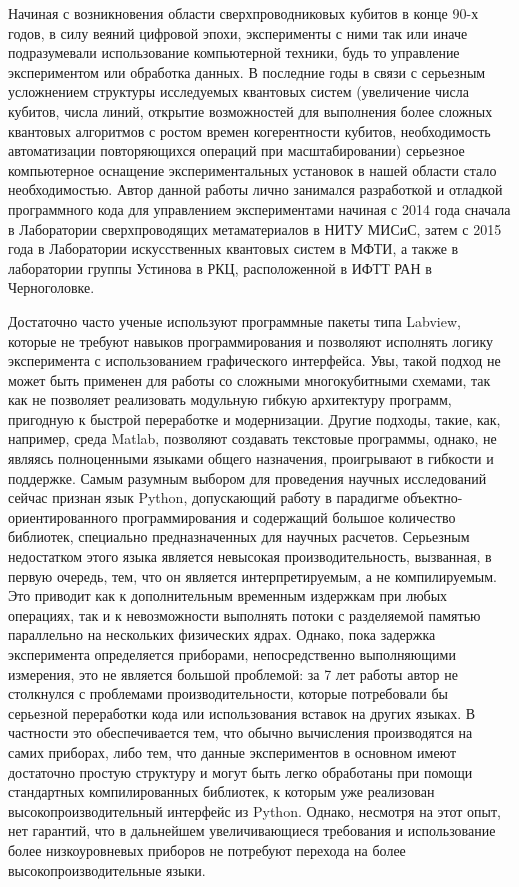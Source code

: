 \documentclass[14pt, a4paper]{extreport}
\numberwithin{equation}{section}
\begin{document}
Начиная с возникновения области сверхпроводниковых кубитов в конце  90-х годов, в силу веяний цифровой эпохи, эксперименты с ними так или иначе подразумевали использование компьютерной техники, будь то управление экспериментом или обработка данных. В последние годы в связи с серьезным усложнением структуры исследуемых квантовых систем (увеличение числа кубитов, числа линий, открытие возможностей для выполнения более сложных квантовых алгоритмов с ростом времен когерентности кубитов, необходимость автоматизации повторяющихся операций при масштабировании) серьезное компьютерное оснащение экспериментальных установок в нашей области стало необходимостью. Автор данной работы лично занимался разработкой и отладкой программного кода для управлением экспериментами начиная с 2014 года сначала в Лаборатории сверхпроводящих метаматериалов в НИТУ МИСиС, затем с 2015 года в Лаборатории искусственных квантовых систем в МФТИ, а также в лаборатории группы Устинова в РКЦ, расположенной в ИФТТ РАН в Черноголовке. 

Достаточно часто ученые используют программные пакеты типа Labview, которые не требуют навыков программирования и позволяют исполнять логику эксперимента с использованием графического интерфейса. Увы, такой подход не может быть применен для работы со сложными многокубитными схемами, так как не позволяет реализовать модульную гибкую архитектуру программ, пригодную к быстрой переработке и модернизации. Другие подходы, такие, как, например, среда Matlab, позволяют создавать текстовые программы, однако, не являясь полноценными языками общего назначения, проигрывают в гибкости и поддержке. Самым разумным выбором для проведения научных исследований сейчас признан язык Python, допускающий работу в парадигме объектно-ориентированного программирования и содержащий большое количество библиотек, специально предназначенных для научных расчетов. Серьезным недостатком этого языка является невысокая производительность, вызванная, в первую очередь, тем, что он является интерпретируемым, а не компилируемым. Это приводит как к дополнительным временным издержкам при любых операциях, так и к невозможности выполнять потоки с разделяемой памятью параллельно на нескольких физических ядрах. Однако, пока задержка эксперимента определяется приборами, непосредственно выполняющими измерения, это не является большой проблемой: за 7 лет работы автор не столкнулся с проблемами производительности, которые потребовали бы серьезной переработки кода или использования вставок на других языках. В частности это обеспечивается тем, что обычно вычисления производятся на самих приборах, либо тем, что данные экспериментов в основном имеют достаточно простую структуру и могут быть легко обработаны при помощи стандартных компилированных библиотек, к которым уже реализован высокопроизводительный интерфейс из Python. Однако, несмотря на этот опыт, нет гарантий, что в дальнейшем увеличивающиеся требования и использование более низкоуровневых приборов не потребуют перехода на более высокопроизводительные языки.
\end{document}
